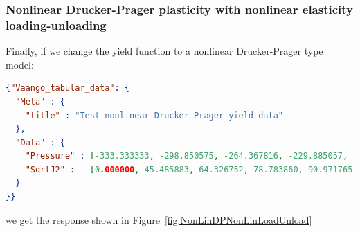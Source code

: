 \subsubsection{Nonlinear Drucker-Prager plasticity with nonlinear elasticity loading-unloading} 
Finally, if we change the yield function to a nonlinear Drucker-Prager type model:
\begin{lstlisting}[language=JSON]
{"Vaango_tabular_data": {
  "Meta" : {
    "title" : "Test nonlinear Drucker-Prager yield data"
  },
  "Data" : {
    "Pressure" : [-333.333333, -298.850575, -264.367816, -229.885057, -195.402299, -160.919540, -126.436782, -91.954023, -57.471264, -22.988506, 11.494253, 45.977011, 80.459770, 114.942529, 149.425287, 183.908046, 218.390805, 252.873563, 287.356322, 321.839080, 356.321839, 390.804598, 425.287356, 459.770115, 494.252874, 528.735632, 563.218391, 597.701149, 632.183908, 666.666667],
    "SqrtJ2" :   [0.000000, 45.485883, 64.326752, 78.783860, 90.971765, 101.709526, 111.417203, 120.344334, 128.653504, 136.457648, 143.838990, 150.859606, 157.567719, 164.001682, 170.192589, 176.166066,181.943530, 187.543098, 192.980256, 198.268366, 203.419051, 208.442500, 213.347701, 218.142630, 222.834406, 227.429413, 231.933403, 236.351579, 240.688667, 244.948974]
  }
}}
\end{lstlisting}
we get the response shown in Figure~\ref{fig:NonLinDPNonLinLoadUnload}
